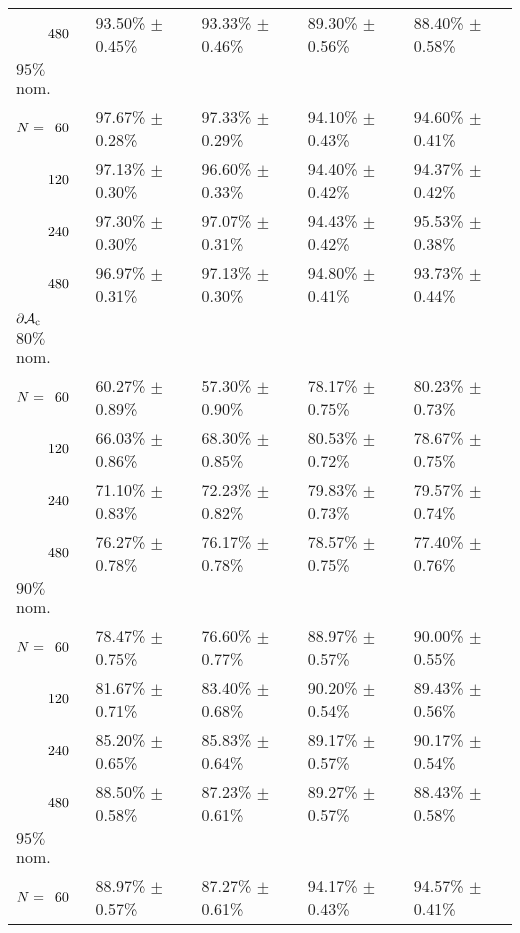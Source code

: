 \begin{onehalfspace}
\begin{table}[htbp]
\begin{tabular}{@{}p{}*{4}{L{\tabcolsep\relax}}@{}}
$\hphantom{N{}={}}480$ & 93.50\% $\pm$ 0.45\% & 93.33\% $\pm$ 0.46\% & 89.30\% $\pm$ 0.56\% & 88.40\% $\pm$ 0.58\%\\ 
$95\%$ nom.  \\[-0.4em]
$N = \hphantom{1}60$ & 97.67\% $\pm$ 0.28\% & 97.33\% $\pm$ 0.29\% & 94.10\% $\pm$ 0.43\% & 94.60\% $\pm$ 0.41\% \\[-0.4em]
$\hphantom{N{}={}}120$ & 97.13\% $\pm$ 0.30\% & 96.60\% $\pm$ 0.33\% & 94.40\% $\pm$ 0.42\% & 94.37\% $\pm$ 0.42\% \\[-0.4em]
$\hphantom{N{}={}}240$ & 97.30\% $\pm$ 0.30\% & 97.07\% $\pm$ 0.31\% & 94.43\% $\pm$ 0.42\% & 95.53\% $\pm$ 0.38\% \\[-0.4em]
$\hphantom{N{}={}}480$ & 96.97\% $\pm$ 0.31\% & 97.13\% $\pm$ 0.30\% & 94.80\% $\pm$ 0.41\% & 93.73\% $\pm$ 0.44\%\\
\midrule
$\mathbf{\operatorname{\partial\mathcal{A}_{c}}}$\\[-0.4em]
$80\%$ nom.\\[-0.4em]
$N = \hphantom{1}60$ & 60.27\% $\pm$ 0.89\% & 57.30\% $\pm$ 0.90\% & 78.17\% $\pm$ 0.75\% & 80.23\% $\pm$ 0.73\% \\[-0.4em]
$\hphantom{N{}={}}120$ & 66.03\% $\pm$ 0.86\% & 68.30\% $\pm$ 0.85\% & 80.53\% $\pm$ 0.72\% & 78.67\% $\pm$ 0.75\%\\[-0.4em]
$\hphantom{N{}={}}240$ & 71.10\% $\pm$ 0.83\% & 72.23\% $\pm$ 0.82\% & 79.83\% $\pm$ 0.73\% & 79.57\% $\pm$ 0.74\% \\[-0.4em]
$\hphantom{N{}={}}480$ & 76.27\% $\pm$ 0.78\% & 76.17\% $\pm$ 0.78\% & 78.57\% $\pm$ 0.75\% & 77.40\% $\pm$ 0.76\%\\ 
$90\%$ nom.  \\[-0.4em]
$N = \hphantom{1}60$ & 78.47\% $\pm$ 0.75\% & 76.60\% $\pm$ 0.77\% & 88.97\% $\pm$ 0.57\% & 90.00\% $\pm$ 0.55\% \\[-0.4em]
$\hphantom{N{}={}}120$ & 81.67\% $\pm$ 0.71\% & 83.40\% $\pm$ 0.68\% & 90.20\% $\pm$ 0.54\% & 89.43\% $\pm$ 0.56\% \\[-0.4em]
$\hphantom{N{}={}}240$ & 85.20\% $\pm$ 0.65\% & 85.83\% $\pm$ 0.64\% & 89.17\% $\pm$ 0.57\% & 90.17\% $\pm$ 0.54\% \\[-0.4em]
$\hphantom{N{}={}}480$ & 88.50\% $\pm$ 0.58\% & 87.23\% $\pm$ 0.61\% & 89.27\% $\pm$ 0.57\% & 88.43\% $\pm$ 0.58\%\\ 
$95\%$ nom.  \\[-0.4em]
$N = \hphantom{1}60$ & 88.97\% $\pm$ 0.57\% & 87.27\% $\pm$ 0.61\% & 94.17\% $\pm$ 0.43\% & 94.57\% $\pm$ 0.41\% \\[-0.4em]

\end{tabular}
\end{table}
\end{onehalfspace}
